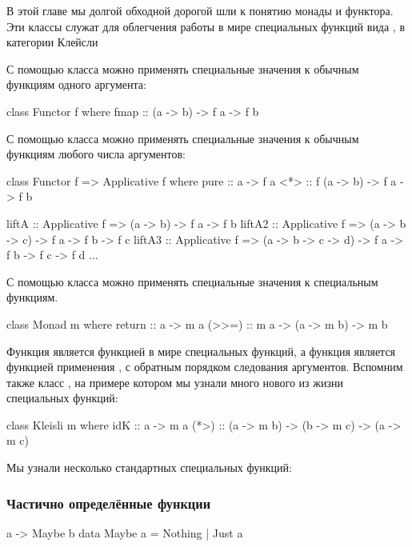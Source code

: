 В этой главе мы долгой обходной дорогой шли к понятию монады
и функтора. Эти классы служат для облегчения работы в мире
специальных функций вида , в категории Клейсли

С помощью класса  можно применять специальные
значения к обычным функциям одного аргумента:

\begin{code}
class Functor f where
    fmap :: (a -> b) -> f a -> f b
\end{code}

С помощью класса  можно применять специальные
значения к обычным функциям любого числа аргументов:

\begin{code}
class Functor f => Applicative f where
    pure    :: a -> f a
    <*>     :: f (a -> b) -> f a -> f b

liftA  :: Applicative f => (a -> b) -> f a -> f b
liftA2 :: Applicative f => (a -> b -> c) -> f a -> f b -> f c
liftA3 :: Applicative f => (a -> b -> c -> d) -> f a -> f b -> f c -> f d
...
\end{code}


С помощью класса  можно применять специальные
значения к специальным функциям.

\begin{code}
class Monad m where
    return  :: a -> m a
    (>>=)   :: m a -> (a -> m b) -> m b
\end{code}

Функция  является функцией  в 
мире специальных функций, а функция \In{>>=} 
является функцией применения \In{($)}, с обратным 
порядком следования аргументов. Вспомним также
класс , на примере котором мы узнали много
нового из жизни специальных функций:

\begin{code}
class Kleisli m where
    idK     :: a -> m a
    (*>)    :: (a -> m b) -> (b -> m c) -> (a -> m c)
\end{code}

Мы узнали несколько стандартных специальных функций:

\subsubsection{Частично определённые функции}

\begin{code}
a -> Maybe b
data Maybe a = Nothing | Just a
\end{code}


